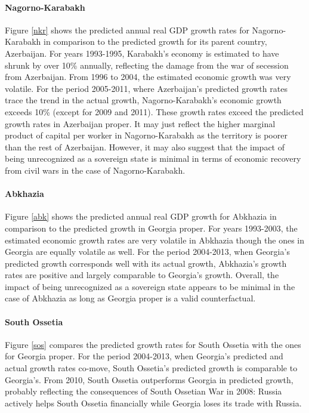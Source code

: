 \documentclass[12pt,a4paper]{article}%
\begin{document}
\paragraph{Nagorno-Karabakh}
Figure \ref{nkr} shows the predicted annual real GDP growth rates for Nagorno-Karabakh in comparison to the predicted growth for its parent country, Azerbaijan. 
For years 1993-1995, Karabakh's economy is estimated to have shrunk by over 10\% annually, reflecting the damage from the war of secession from Azerbaijan. 
From 1996 to 2004, the estimated economic growth was very volatile.
For the period 2005-2011, where Azerbaijan's predicted growth rates trace the trend in the actual growth, Nagorno-Karabakh's economic growth exceeds 10\% (except for 2009 and 2011). 
These growth rates exceed the predicted growth rates in Azerbaijan proper.
It may just reflect the higher marginal product of capital per worker in Nagorno-Karabakh as the territory is poorer than the rest of Azerbaijan. 
However, it may also suggest that the impact of being unrecognized as a sovereign state is minimal in terms of economic recovery from civil wars in the case of Nagorno-Karabakh.

\paragraph{Abkhazia}
Figure \ref{abk} shows the predicted annual real GDP growth for Abkhazia in comparison to the predicted growth in Georgia proper. 
For years 1993-2003, the estimated economic growth rates are very volatile in Abkhazia though the ones in Georgia are equally volatile as well.
For the period 2004-2013, when Georgia's predicted growth corresponds well with its actual growth, Abkhazia's growth rates are positive and largely comparable to Georgia's growth.   
Overall, the impact of being unrecognized as a sovereign state appears to be minimal in the case of Abkhazia as long as Georgia proper is a valid counterfactual.

\paragraph{South Ossetia}
Figure \ref{sos} compares the predicted growth rates for South Ossetia with the ones for Georgia proper.
For the period 2004-2013, when Georgia's predicted and actual growth rates co-move, South Ossetia's predicted growth is comparable to Georgia's.
From 2010, South Ossetia outperforms Georgia in predicted growth, probably reflecting the consequences of South Ossetian War in 2008: Russia actively helps South Ossetia financially while Georgia loses its trade with Russia.
\end{document}
